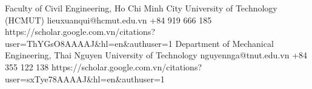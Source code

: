 \documentclass{simplecv}
\begin{document}
			{Faculty of Civil Engineering, Ho Chi Minh City University of Technology (HCMUT)}
	{lieuxuanqui@hcmut.edu.vn}
	{+84 919 666 185 }
	{https://scholar.google.com.vn/citations?user=ThYGsO8AAAAJ&hl=en&authuser=1}
	{Department of Mechanical Engineering, Thai Nguyen University of Technology}
	{nguyennga@tnut.edu.vn}
	{ +84 355 122 138}
	{https://scholar.google.com.vn/citations?user=sxTye78AAAAJ&hl=en&authuser=1}
\end{document}
